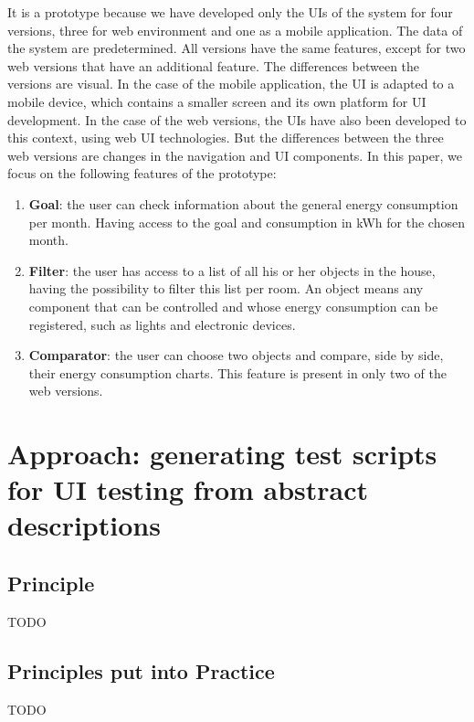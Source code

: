 \documentclass{chi-ext}
\begin{document}
It is a prototype because we have developed only the UIs of the system for four versions, three for web environment and one as a mobile application. The data of the system are predetermined. All versions have the same features, except for two web versions that have an additional feature. The differences between the versions are visual. In the case of the mobile application, the UI is adapted to a mobile device, which contains a smaller screen and its own platform for UI development. In the case of the web versions, the UIs have also been developed to this context, using web UI technologies. But the differences between the three web versions are changes in the navigation and UI components. In this paper, we focus on the following features of the prototype:

\begin{enumerate}

\item \textbf{Goal}: the user can check information about the general energy consumption per month. Having access to the goal and consumption in kWh for the chosen month. 

\item \textbf{Filter}: the user has access to a list of all his or her objects in the house, having the possibility to filter this list per room. An object means any component that can be controlled and whose energy consumption can be registered, such as lights and electronic devices.

\item \textbf{Comparator}: the user can choose two objects and compare, side by side, their energy consumption charts. This feature is present in only two of the web versions.

\end{enumerate} 


\section{Approach: generating test scripts for UI testing from abstract descriptions}
\subsection{Principle}
TODO

\subsection{Principles put into Practice}
TODO
\end{document}
